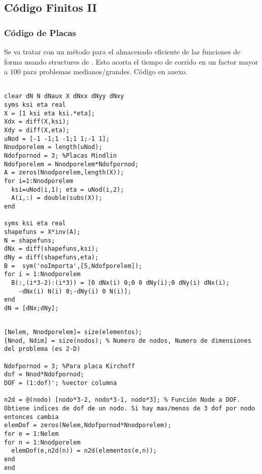  \clearpage
 \subsection*{Código \Matlab{} Finitos II}
    \subsubsection*{Código de Placas}
    Se va tratar con un método para el almacenado eficiente de las funciones de forma usando structures de \Matlab{}. Esto acorta el tiempo de corrido en un factor mayor a 100 para problemas medianos/grandes. Código en anexo.

    \begin{code}
    \begin{verbatim}

clear dN N dNaux X dNxx dNyy dNxy 
syms ksi eta real
X = [1 ksi eta ksi.*eta];
Xdx = diff(X,ksi);
Xdy = diff(X,eta);
uNod = [-1 -1;1 -1;1 1;-1 1];
Nnodporelem = length(uNod);
Ndofpornod = 3; %Placas Mindlin
Ndofporelem = Nnodporelem*Ndofpornod;
A = zeros(Nnodporelem,length(X));
for i=1:Nnodporelem
  ksi=uNod(i,1); eta = uNod(i,2);
  A(i,:) = double(subs(X));
end

syms ksi eta real
shapefuns = X*inv(A);
N = shapefuns;
dNx = diff(shapefuns,ksi);
dNy = diff(shapefuns,eta);
B =  sym('noImporta',[5,Ndofporelem]);
for i = 1:Nnodporelem
  B(:,(i*3-2):(i*3)) = [0 dNx(i) 0;0 0 dNy(i);0 dNy(i) dNx(i);
	-dNx(i) N(i) 0;-dNy(i) 0 N(i)];
end
dN = [dNx;dNy];
    \end{verbatim}
    \end{code}

\begin{code}
	\begin{verbatim}

[Nelem, Nnodporelem]= size(elementos);  
[Nnod, Ndim] = size(nodos); % Numero de nodos, Numero de dimensiones del problema (es 2-D)

Ndofpornod = 3; %Para placa Kirchoff
dof = Nnod*Ndofpornod;
DOF = (1:dof)'; %vector columna

n2d = @(nodo) [nodo*3-2, nodo*3-1, nodo*3]; % Función Node a DOF. Obtiene indices de dof de un nodo. Si hay mas/menos de 3 dof por nodo entonces cambia
elemDof = zeros(Nelem,Ndofpornod*Nnodporelem);
for e = 1:Nelem
for n = 1:Nnodporelem
  elemDof(e,n2d(n)) = n2d(elementos(e,n));
end
end
	\end{verbatim}
\end{code}

